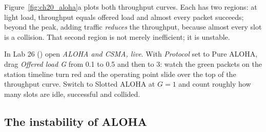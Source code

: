 

Figure~\ref{fig:ch20_aloha}a plots both throughput curves. Each has two regions: at light load,
throughput equals offered load and almost every packet succeeds; beyond the peak, adding traffic
\emph{reduces} the throughput, because almost every slot is a collision. That second region is not
merely inefficient; it is unstable.

\begin{tryit}
In Lab 26 () open \emph{ALOHA and CSMA, live}. With \emph{Protocol} set
to Pure ALOHA, drag \emph{Offered load G} from 0.1 to 0.5 and then to 3: watch the green packets on the
station timeline turn red and the operating point slide over the top of the throughput curve. Switch to
Slotted ALOHA at $G=1$ and count roughly how many slots are idle, successful and collided.
\end{tryit}

\subsection{The instability of ALOHA}


